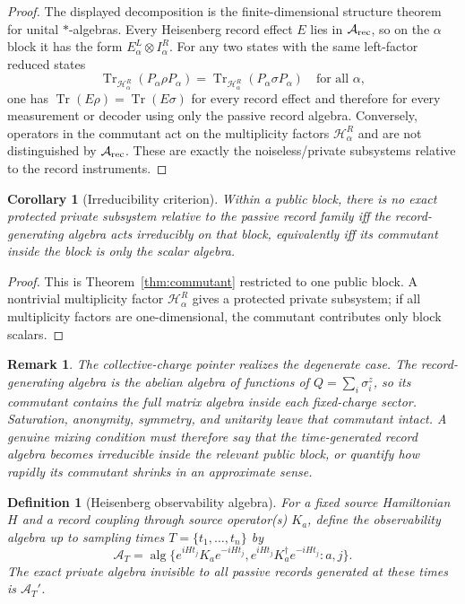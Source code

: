 \documentclass[11pt]{article}
\newtheorem{corollary}{Corollary}
\newtheorem{definition}{Definition}
\newtheorem{remark}{Remark}
\newcommand{\cH}{\mathcal H}
\newcommand{\cA}{\mathcal A}
\newcommand{\Tr}{\operatorname{Tr}}
\begin{document}
\begin{proof}
The displayed decomposition is the finite-dimensional structure theorem
for unital $*$-algebras.  Every Heisenberg record effect $E$ lies in
$\cA_{\rm rec}$, so on the $\alpha$ block it has the form
$E_\alpha^L\otimes I_\alpha^R$.  For any two states with the same
left-factor reduced states
\begin{equation}
  \Tr_{\cH_\alpha^R}(P_\alpha\rho P_\alpha)
  =
  \Tr_{\cH_\alpha^R}(P_\alpha\sigma P_\alpha)
  \quad \text{for all }\alpha ,
\end{equation}
one has $\Tr(E\rho)=\Tr(E\sigma)$ for every record effect and therefore
for every measurement or decoder using only the passive record algebra.
Conversely, operators in the commutant act on the multiplicity factors
$\cH_\alpha^R$ and are not distinguished by $\cA_{\rm rec}$.  These are
exactly the noiseless/private subsystems relative to the record
instruments.
\end{proof}

\begin{corollary}[Irreducibility criterion]
\label{cor:irreducible}
Within a public block, there is no exact protected private subsystem
relative to the passive record family iff the record-generating algebra
acts irreducibly on that block, equivalently iff its commutant inside the
block is only the scalar algebra.
\end{corollary}

\begin{proof}
This is Theorem~\ref{thm:commutant} restricted to one public block.  A
nontrivial multiplicity factor $\cH_\alpha^R$ gives a protected private
subsystem; if all multiplicity factors are one-dimensional, the
commutant contributes only block scalars.
\end{proof}

\begin{remark}
The collective-charge pointer realizes the degenerate case.  The
record-generating algebra is the abelian algebra of functions of
$Q=\sum_i\sigma_i^z$, so its commutant contains the full matrix algebra
inside each fixed-charge sector.  Saturation, anonymity, symmetry, and
unitarity leave that commutant intact.  A genuine mixing condition must
therefore say that the time-generated record algebra becomes irreducible
inside the relevant public block, or quantify how rapidly its commutant
shrinks in an approximate sense.
\end{remark}

\begin{definition}[Heisenberg observability algebra]
For a fixed source Hamiltonian $H$ and a record coupling through source
operator(s) $K_a$, define the observability algebra up to sampling times
$T=\{t_1,\ldots,t_n\}$ by
\begin{equation}
  \cA_T
  =
  \operatorname{alg}\{
    e^{iHt_j}K_a e^{-iHt_j},
    e^{iHt_j}K_a^\dagger e^{-iHt_j}
    : a,j
  \}.
\end{equation}
The exact private algebra invisible to all passive records generated at
these times is $\cA_T'$.
\end{definition}
\end{document}
